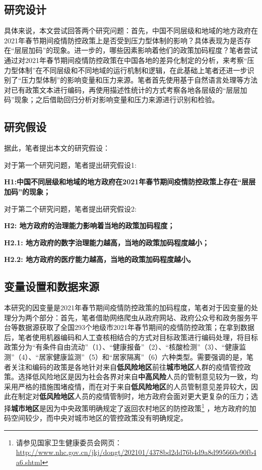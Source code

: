 \documentclass[
  12pt,
]{ctexart}
\begin{document}
\hypertarget{ux7814ux7a76ux8bbeux8ba1}{%
\subsection{研究设计}\label{ux7814ux7a76ux8bbeux8ba1}}

具体来说，本文尝试回答两个研究问题：首先，中国不同层级和地域的地方政府在2021年春节期间疫情防控政策上是否受到压力型体制的影响？具体表现为是否存在``层层加码''的现象。进一步的，哪些因素影响着他们的政策加码程度？笔者尝试通过对2021年春节期间疫情防控政策在中国各地的差异化制定的分析，来考察``压力型体制''在不同层级和不同地域的运行机制和逻辑，在此基础上笔者还进一步识别了``压力型体制''的影响变量和压力来源。笔者首先使用基于自然语言处理等方法对已有政策文本进行编码，再使用描述性统计的方式考察各地各层级的``层层加码''现象；之后借助回归分析对影响变量和压力来源进行识别和检验。

\hypertarget{ux7814ux7a76ux5047ux8bbe}{%
\subsection{研究假设}\label{ux7814ux7a76ux5047ux8bbe}}

据此，笔者提出本文的研究假设：

对于第一个研究问题，笔者提出研究假设1:

\textbf{H1:中国不同层级和地域的地方政府在2021年春节期间疫情防控政策上存在``层层加码''的现象；}

对于第二个研究问题，笔者提出研究假设2:

\textbf{H2: 地方政府的治理能力影响着当地的政策加码程度；}

\textbf{H2.1: 地方政府的数字治理能力越高，当地的政策加码程度越小；}

\textbf{H2.2: 地方政府的医疗能力越高，当地的政策加码程度越小。}

\hypertarget{ux53d8ux91cfux8bbeux7f6eux548cux6570ux636eux6765ux6e90}{%
\subsection{变量设置和数据来源}\label{ux53d8ux91cfux8bbeux7f6eux548cux6570ux636eux6765ux6e90}}

本研究的因变量是2021年春节期间疫情防控政策的加码程度，笔者对于因变量的处理分为两个部分：首先，笔者借助网络爬虫从政府网站、政府公众号和政务服务平台等数据源获取了全国293个地级市2021年春节期间的疫情防控政策；在拿到数据后，笔者使用机器编码和人工查核相结合的方式对目标政策进行编码处理，将目标政策分为``有条件自由流动''（1）、``健康报备''（2）、``核酸检测''（3）、``健康监测''（4）、``居家健康监测''（5）和``居家隔离''（6）六种类型。需要强调的是，笔者关注和编码的政策是各地针对来自\textbf{低风险地区}前往\textbf{城市地区}人群的疫情管控政策。选择低风险地区是因为社会各界对来自\textbf{中高风险}人员的管制意见较为一致，均采用严格的措施围堵疫情，而在对于来自\textbf{低风险地区}的人员管制意见差异较大，因此在制定对\textbf{低风险地区}人员的疫情管制时，地方政府会面对更大更复杂的压力；选择\textbf{城市地区}是因为中央政策明确规定了返回农村地区的防控政策\footnote{请参见国家卫生健康委员会网页：\url{http://www.nhc.gov.cn/jkj/dongt/202101/4378bd2dd76b4d9a8d995660e90fb4a6.shtml}} ，地方政府的加码空间较少，而中央对城市地区的管控政策没有明确规定。
\end{document}
